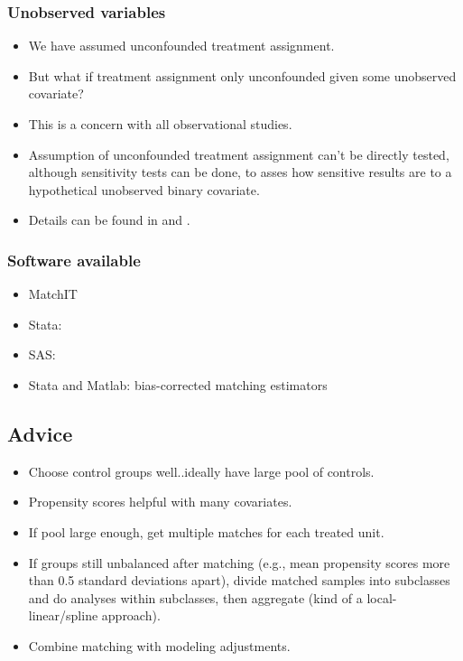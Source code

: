 \documentclass[11pt,titlepage]{article}
\begin{document}
\subsubsection{Unobserved variables}
\begin{itemize}
\item We have assumed unconfounded treatment assignment.  
\item But what if treatment assignment only unconfounded given some unobserved covariate?  
\item This is a concern with  all observational studies. 
\item Assumption of unconfounded treatment assignment can't be directly tested, although sensitivity tests can be done, to asses how sensitive
results are to a hypothetical unobserved binary covariate.  
\item Details can be found in \cite{RosRub83b} and \cite{Imbens03}.  
\end{itemize}

\subsubsection{Software available}
\begin{itemize} 
\item MatchIT
\item Stata: \cite{AbaDruHerImb02, BecIch02, LeuSia03}
\item SAS: \cite{Dagostino98}
\item Stata and Matlab: \cite{AbaImb04} bias-corrected matching estimators
\end{itemize} 

\subsection{Advice}
\begin{itemize}
\item Choose control groups well..ideally have large pool of controls.  
\item Propensity scores helpful with many covariates.  
\item If pool large enough, get multiple matches for each treated unit.  
\item If groups still unbalanced after matching (e.g., mean propensity scores more than 0.5 standard deviations apart), divide matched samples into
subclasses and do analyses within subclasses, then aggregate (kind of a local-linear/spline approach). 
\item Combine matching with modeling adjustments.  
\end{itemize} 
\end{document}
